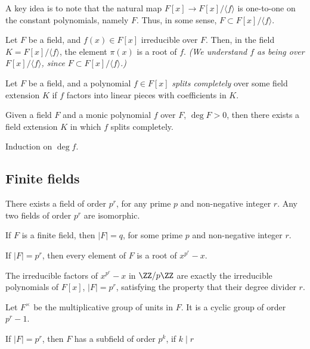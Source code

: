 
A key idea is to note that the natural map $F[x] \to F[x]/ \langle f \rangle$ is one-to-one on the constant polynomials, namely $F$. Thus, in some sense, $F \subset F[x]/ \langle f \rangle$.

\begin{lem}
	Let $F$ be a field, and $f(x) \in F[x]$ irreducible over $F$. Then, in the field $K = F[x] / \langle f \rangle$, the element  $\pi(x)$ is a root of $f$. \emph{(We understand $f$ as being over $F[x] / \langle f \rangle$, since $F \subset F[x]/ \langle f \rangle$.)}
\end{lem}

\begin{defn}
	Let $F$ be a field, and a polynomial $f \in F[x]$ \emph{splits completely} over some field extension $K$ if $f$ factors into linear pieces with coefficients in $K$.
\end{defn}

\begin{lem}
	Given a field $F$ and a monic polynomial $f$ over $F$, $\deg F > 0$, then there exists a field extension $K$ in which $f$ splits completely.
\end{lem}

\begin{sk}
	Induction on $\deg f$.
\end{sk}

\subsection{Finite fields}

\begin{thm}
	There exists a field of order $p^r$, for any prime $p$ and non-negative integer $r$. Any two fields of order $p^r$ are isomorphic.
\end{thm}

\begin{thm}
	If $F$ is a finite field, then $|F| = q$, for some prime $p$ and non-negative integer $r$.
\end{thm}

\begin{thm}
	If $|F| = p^r$, then every element of $F$ is a root of $x^{p^r} - x$.
\end{thm}

\begin{thm}
	The irreducible factors of $x^{p^r} - x$ in $\ZZ/p\ZZ$ are exactly the irreducible polynomials of $F[x]$, $|F| = p^r$, satisfying the property that their degree divider $r$.
\end{thm}

\begin{thm}
	Let $F^\times$ be the multiplicative group of units in $F$. It is a cyclic group of order $p^r - 1$.
\end{thm}

\begin{thm}
	If $|F| = p^r$, then $F$ has a subfield of order $p^k$, if $k \mid r$
\end{thm}
